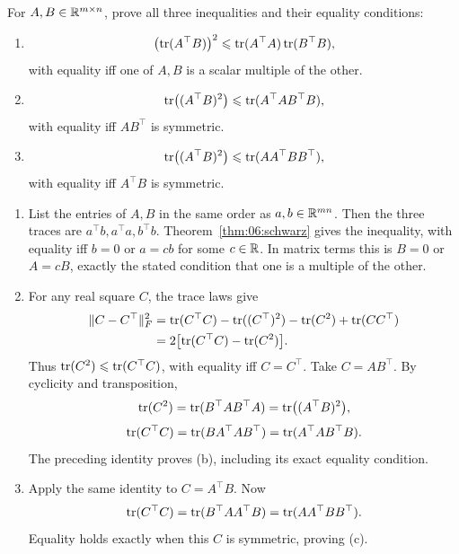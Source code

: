 \begin{problem}\label{ex:06:trace-inequalities}
For \(A,B\in\mathbb R^{m\times n}\), prove all three inequalities and their
equality conditions:
\begin{enumerate}
\item
\[
\bigl(\operatorname{tr}(A^\top B)\bigr)^2
\leqslant\operatorname{tr}(A^\top A)\operatorname{tr}(B^\top B),
\]
with equality iff one of \(A,B\) is a scalar multiple of the other.
\item
\[
\operatorname{tr}\bigl((A^\top B)^2\bigr)\leqslant\operatorname{tr}(A^\top AB^\top B),
\]
with equality iff \(AB^\top\) is symmetric.
\item
\[
\operatorname{tr}\bigl((A^\top B)^2\bigr)\leqslant\operatorname{tr}(AA^\top BB^\top),
\]
with equality iff \(A^\top B\) is symmetric.
\end{enumerate}
\end{problem}
\begin{solution}
\begin{enumerate}
\item List the entries of \(A,B\) in the same order as \(a,b\in\mathbb R^{mn}\).
Then the three traces are \(a^\top b,a^\top a,b^\top b\).
Theorem~\ref{thm:06:schwarz} gives the inequality, with equality iff
\(b=0\) or \(a=cb\) for some \(c\in\mathbb R\).
In matrix terms this is \(B=0\) or \(A=cB\), exactly the stated condition
that one is a multiple of the other.
\item For any real square \(C\), the trace laws give
\[
\begin{aligned}
\|C-C^\top\|_F^2
&=\operatorname{tr}(C^\top C)-\operatorname{tr}((C^\top)^2)-\operatorname{tr}(C^2)+\operatorname{tr}(CC^\top)\\
&=2\bigl[\operatorname{tr}(C^\top C)-\operatorname{tr}(C^2)\bigr].
\end{aligned}
\]
Thus \(\operatorname{tr}(C^2)\leqslant\operatorname{tr}(C^\top C)\), with equality iff \(C=C^\top\).
Take \(C=AB^\top\). By cyclicity and transposition,
\[
\operatorname{tr}(C^2)=\operatorname{tr}(B^\top AB^\top A)
=\operatorname{tr}\bigl((A^\top B)^2\bigr),
\]
\[
\operatorname{tr}(C^\top C)=\operatorname{tr}(BA^\top AB^\top)=\operatorname{tr}(A^\top AB^\top B).
\]
The preceding identity proves (b), including its exact equality condition.
\item Apply the same identity to \(C=A^\top B\). Now
\[
\operatorname{tr}(C^\top C)=\operatorname{tr}(B^\top AA^\top B)=\operatorname{tr}(AA^\top BB^\top).
\]
Equality holds exactly when this \(C\) is symmetric, proving (c).
\end{enumerate}
\end{solution}

